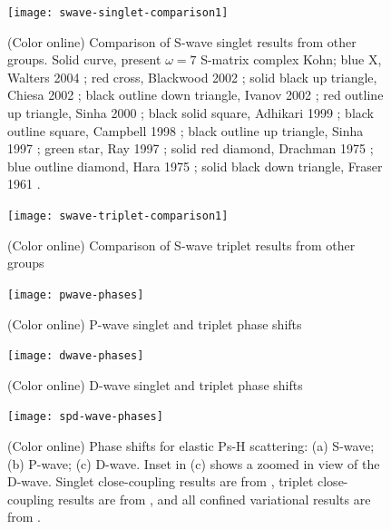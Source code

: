 \documentclass[preprint,showpacs,preprintnumbers,amsmath,amssymb]{revtex4}
\newcommand{\todoi}{\todo[inline]}
\begin{document}
\begin{figure}[H]
	\centering
	\texttt{[image: swave-singlet-comparison1]}
	\caption{(Color online) Comparison of S-wave singlet results from other groups. Solid curve, present $\omega = 7$ S-matrix complex Kohn; blue X, Walters 2004 \cite{Walters2004}; red cross, Blackwood 2002 \cite{Blackwood2002}; solid black up triangle, Chiesa 2002 \cite{Chiesa2002}; black outline down triangle, Ivanov 2002 \cite{Ivanov2002}; red outline up triangle, Sinha 2000 \cite{Sinha2000}; black solid square, Adhikari 1999 \cite{Adhikari1999}; black outline square, Campbell 1998 \cite{Campbell1998}; black outline up triangle, Sinha 1997 \cite{Sinha1997}; green star, Ray 1997 \cite{Ray1997}; solid red diamond, Drachman 1975 \cite{Drachman1975}; blue outline diamond, Hara 1975 \cite{Hara1975}; solid black down triangle, Fraser 1961 \cite{Fraser1961}.}
	\label{fig:SwaveSingletComparison}
\end{figure}

\begin{figure}[H]
	\centering
	\texttt{[image: swave-triplet-comparison1]}
	\caption{(Color online) Comparison of S-wave triplet results from other groups}
	\label{fig:SwaveTripletComparison}
\end{figure}

%


\begin{figure}[H]
	\centering
	\texttt{[image: pwave-phases]}
	\caption{(Color online) P-wave singlet and triplet phase shifts}
	\label{fig:pwave-phases}
\end{figure}


\begin{figure}[H]
	\centering
	\texttt{[image: dwave-phases]}
	\caption{(Color online) D-wave singlet and triplet phase shifts}
	\label{fig:dwave-phases}
\end{figure}

\begin{figure}[H]
	\centering
	\texttt{[image: spd-wave-phases]}
	\caption{(Color online) Phase shifts for elastic Ps-H scattering: (a) S-wave; (b) P-wave; (c) D-wave. Inset in (c) shows a zoomed in view of the D-wave. Singlet close-coupling results are from \cite{Walters2004}, triplet close-coupling results are from \cite{Blackwood2002}, and all confined variational results are from \cite{Zhang2012}.}
	\label{fig:spd-wave-phases}
\end{figure}
\end{document}
